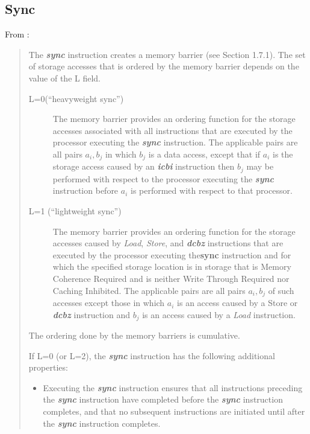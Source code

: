 \documentclass[10pt]{article}
\def\sync{\mbox{\bf\em sync}}
\begin{document}
\subsection{Sync}\label{sec:sync}
From \cite[p.~26,Sec 3.3.3]{ppc-2}: 
\begin{quotation}
  The {\sync} instruction creates a memory barrier (see Section
  1.7.1). The set of storage accesses that is ordered by the memory
  barrier depends on the value of the L field.

  \begin{description}
    \item[L=0(``heavyweight sync'')] 

      The memory barrier provides an ordering function for the storage
      accesses associated with all instructions that are executed by
      the processor executing the {\sync} instruction. The
      applicable pairs are all pairs $a_i,b_j$ in which $b_j$ is a
      data access, except that if $a_i$ is the storage access caused
      by an {\em\bf icbi} instruction then $b_j$ may be performed with
      respect to the processor executing the {\sync}
      instruction before $a_i$ is performed with respect to that
      processor.
    \item[L=1 (``lightweight sync'')]

      The memory barrier provides an ordering function for the storage
      accesses caused by {\em Load}, {\em Store}, and {\em\bf dcbz}
      instructions that are executed by the processor executing
      the{\bf sync} instruction and for which the specified storage
      location is in storage that is Memory Coherence Required and is
      neither Write Through Required nor Caching Inhibited. The
      applicable pairs are all pairs $a_i,b_j$ of such accesses except
      those in which $a_i$ is an access caused by a Store or {\em\bf
      dcbz} instruction and $b_j$ is an access caused by a {\em Load}
      instruction.

  \end{description}

The ordering done by the memory barriers is cumulative.

If L=0 (or L=2), the {\sync} instruction has the following
additional properties:

\begin{itemize}
  \item Executing the {\sync} instruction ensures that all
  instructions preceding the {\sync} instruction have completed
  before the {\sync} instruction completes, and that no
  subsequent instructions are initiated until after the {\sync}
  instruction completes.


\end{itemize}
\end{quotation}
\end{document}
